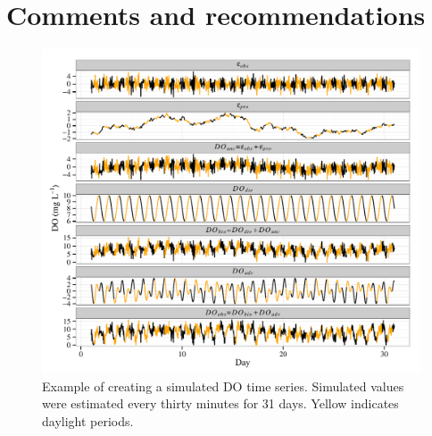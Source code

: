 \documentclass[letterpaper,12pt,oneside]{article}\usepackage[]{graphicx}\usepackage[]{color}
\makeatletter
\def\maxwidth{ %
  \ifdim\Gin@nat@width>\linewidth
    \linewidth
  \else
    \Gin@nat@width
  \fi
}
\newenvironment{knitrout}{}{} %
\makeatother
\begin{document}

\section{Comments and recommendations}

\begin{singlespace}


\end{singlespace}
\clearpage


\centering\vspace*{\fill}
\begin{knitrout}
\color{fgcolor}\begin{figure}[!ht]


{\centering \includegraphics[width=\maxwidth]{figure/do_sim} 

}

\caption[Example of creating a simulated \ac{DO} time series]{Example of creating a simulated \ac{DO} time series.  Simulated values were estimated every thirty minutes for 31 days.  Yellow indicates daylight periods.\label{fig:do_sim}}
\end{figure}


\end{knitrout}
\vfill
\clearpage
\end{document}
